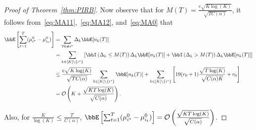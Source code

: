 \documentclass[11pt]{article}
\begin{document}
\begin{proof}[Proof of Theorem~\ref{thm:PIRB}]
Now observe that for $M(T)=\frac{e\sqrt{K\log(K)}}{\sqrt{TC(\alpha)}}$, it follows from~\eqref{eq:MA11},~\eqref{eq:MA12}, and~\eqref{eq:MA0} that 
\begin{align}
    \nonumber
    \bbE  \left[ \sum_{t=1}^{T} (\mu^0_{i^*} -  \mu^0_{i_t})  \right] &= \sum_{\forall k \neq i^*} \Delta_k  \bbE [n_{k}(T)] 
    \\
    \nonumber
    &= \sum_{k\in[K] \setminus \{i^*\}} \left[ \bbI\left(\Delta_k \leq M(T) \right) \Delta_k \bbE [n_{k}(T)]  + \bbI\left(\Delta_k > M(T)\right) \Delta_k \bbE [n_{k}(T)] \right]
    \\
    \nonumber
    &\leq  \frac{e\sqrt{K\log(K)}}{\sqrt{TC(\alpha)}} \sum_{k\in[K] \setminus \{i^*\}}\bbE [n_{k}(T)]  + \sum_{k\in[K] \setminus \{i^*\}} \left[ 19(r_0+1) \frac{\sqrt{T\log(K)}}{\sqrt{C(\alpha)K}} + r_0  \right]
    \\
    &=  \mathcal{O}\left( K + \frac{\sqrt{KT\log(K)}}{\sqrt{C(\alpha)}} \right).
\end{align}

Also, for $\frac{K}{\log(K)}\leq \frac{T}{C(\alpha)}$, $\bbE  \left[ \sum_{t=1}^{T} (\mu^0_{i^*} -  \mu^0_{i_t})  \right] = \mathcal{O}\left(\frac{\sqrt{KT\log(K)}}{\sqrt{C(\alpha)}} \right) $.

\end{proof}
\end{document}
